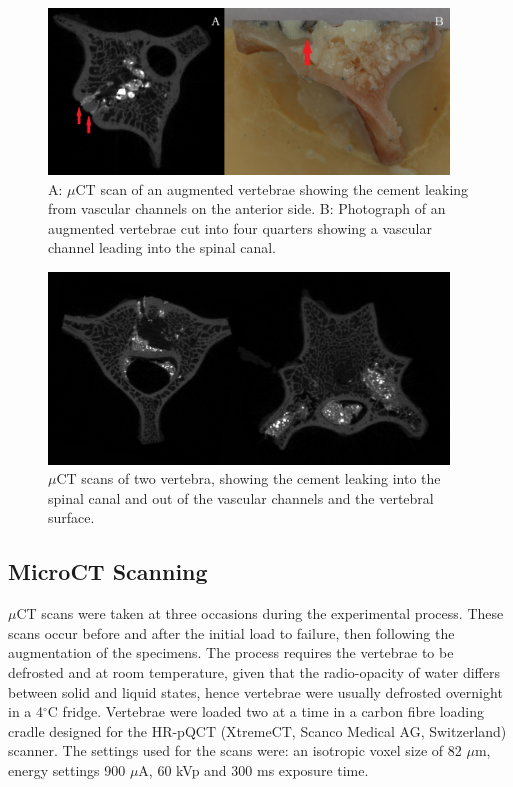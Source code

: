\begin{figure}[ht!]
\centering
\includegraphics[width=4.18472in]{images/cementleakage.png}
\caption{A: $\mu$CT scan of an augmented vertebrae showing the cement leaking from vascular channels on the anterior side. B: Photograph of an augmented vertebrae cut into four quarters showing a vascular channel leading into the spinal canal.}
\label{fig:cementleakage}
\end{figure}

\begin{figure}[ht!]
\centering
\includegraphics[width=4.18472in]{images/bigLeakage_noBluTac.png}
\caption{$\mu$CT scans of two vertebra, showing the cement leaking into the spinal canal and out of the vascular channels and the vertebral surface.}
\label{fig:2vertWithoutBluTac}
\end{figure}


\subsection{MicroCT Scanning}

$\mu$CT scans were taken at three occasions during the experimental process.
These scans occur before and after the initial load to failure, then following
the augmentation of the specimens. The process requires the vertebrae to be
defrosted and at room temperature, given that the radio-opacity of water
differs between solid and liquid states, hence vertebrae were usually defrosted
overnight in a 4$^\circ$C fridge. Vertebrae were loaded two at a time in a
carbon fibre loading cradle designed for the HR-pQCT (XtremeCT, Scanco Medical
AG, Switzerland) scanner. The settings used for the scans were: an isotropic
voxel size of 82 $\mu$m, energy settings 900 $\mu$A, 60 kVp and 300 ms exposure
time.

